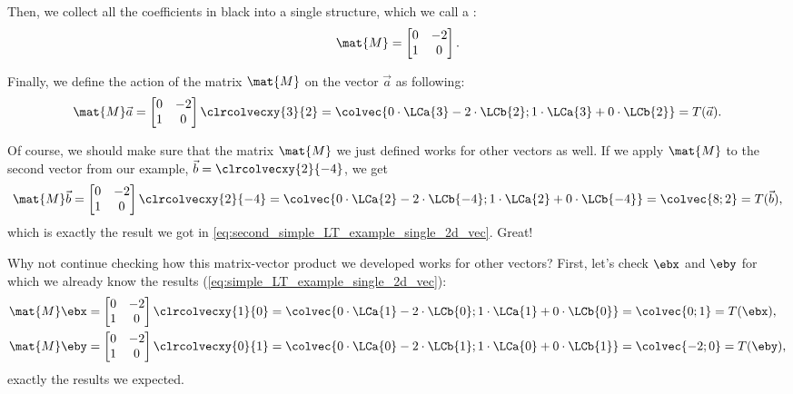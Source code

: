 Then, we collect all the coefficients in black into a single structure, which we call a :
\begin{equation}
	\mat{M} =
	\begin{bmatrix}
		0 & -2 \\
		1 & 0
	\end{bmatrix}.
	\label{eq:developing matrix notation step 2}
\end{equation}

Finally, we define the action of the matrix $\mat{M}$ on the vector $\vec{a}$ as following:
\begin{equation}
	\mat{M}\vec{a} =
	\begin{bmatrix}
		0 & -2 \\
		1 & 0
	\end{bmatrix}\clrcolvecxy{3}{2} = \colvec{0\cdot\LCa{3}-2\cdot\LCb{2};1\cdot\LCa{3}+0\cdot\LCb{2}} = T(\vec{a}).
	\label{eq:developing matrix notation step 3}
\end{equation}

Of course, we should make sure that the matrix $\mat{M}$ we just defined works for other vectors as well. If we apply $\mat{M}$ to the second vector from our example, $\vec{b}=\clrcolvecxy{2}{-4}$, we get
\begin{equation}
	\mat{M}\vec{b} =
	\begin{bmatrix}
		0 & -2 \\
		1 & 0
	\end{bmatrix}\clrcolvecxy{2}{-4} = \colvec{0\cdot\LCa{2}-2\cdot\LCb{-4};1\cdot\LCa{2}+0\cdot\LCb{-4}} = \colvec{8;2} = T(\vec{b}),
	\label{eq:validating matrix works for b}
\end{equation}
which is exactly the result we got in \autoref{eq:second_simple_LT_example_single_2d_vec}. Great!

Why not continue checking how this matrix-vector product we developed works for other vectors? First, let's check $\ebx$ and $\eby$ for which we already know the results (\autoref{eq:simple_LT_example_single_2d_vec}):
\begin{equation}
	\begin{aligned}
		\mat{M}\ebx & =
		\begin{bmatrix}
			0 & -2 \\
			1 & 0
		\end{bmatrix}\clrcolvecxy{1}{0} = \colvec{0\cdot\LCa{1}-2\cdot\LCb{0};1\cdot\LCa{1}+0\cdot\LCb{0}} = \colvec{0;1} = T(\ebx), \\
		\mat{M}\eby & =
		\begin{bmatrix}
			0 & -2 \\
			1 & 0
		\end{bmatrix}\clrcolvecxy{0}{1} = \colvec{0\cdot\LCa{0}-2\cdot\LCb{1};1\cdot\LCa{0}+0\cdot\LCb{1}} = \colvec{-2;0} = T(\eby),
		\label{eq:}
	\end{aligned}
\end{equation}
exactly the results we expected.

